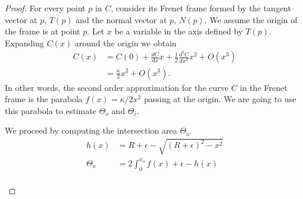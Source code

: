 \begin{proof} For every point $p$ in $C$, consider its Frenet frame formed by the tangent vector at $p$, $T(p)$ and the normal vector at $p$, $N(p)$. We assume the origin of the frame is at point $p$. Let $x$ be a variable in the axis defined by $T(p)$. Expanding $C(x)$ around the origin we obtain
\begin{align*}
	C(x) &= C(0) + \frac{dC}{dx}x + \frac{1}{2}\frac{d^2C}{dx^2}x^2 + O(x^3) \\
	&= \frac{\kappa}{2}x^2 + O(x^3).
\end{align*}
%
In other words, the second order approximation for the curve $C$ in the Frenet frame is the parabola $f(x) =  \kappa/2x^2$ passing at the origin. We are going to use this parabola to estimate $\Theta_o$ and $\Theta_i$.

We proceed by computing the intersection area $\Theta_o$.
\begin{align*}
	h(x) &= R+\epsilon - \sqrt{ (R+\epsilon)^2 - x^2}\\
	\Theta_o &= 2\int_0^{x_o}{f(x) + \epsilon - h(x)}\\
\end{align*}
%
\begin{figure}[h]\label{app1:fig:parabola-approx-ex}
\center
	\hspace{20pt}%
	\subfloat[\label{}]{%
}
\end{figure}
\end{proof}
